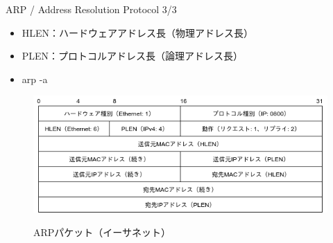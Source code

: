 \documentclass[12pt,aspectratio=169]{beamer}
\begin{document}
\begin{frame}{ARP / Address Resolution Protocol 3/3}

  \begin{itemize}
    \item HLEN：ハードウェアアドレス長（物理アドレス長）
    \item PLEN：プロトコルアドレス長（論理アドレス長）
    \item arp -a
  \end{itemize}

  \centering
  \begin{figure}
    \centering
    \includegraphics[width=12cm,bb=0 0 581 231]{./figures/arp_packet.png}
    \label{fig:arp_packet}
    \caption{ARPパケット（イーサネット）}
  \end{figure}

\end{frame}
\end{document}
